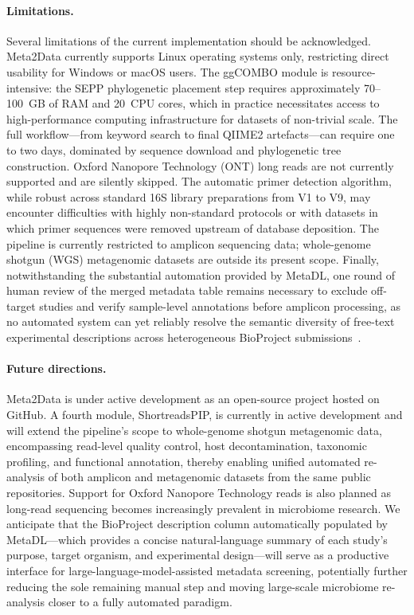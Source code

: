 \paragraph{Limitations.}
Several limitations of the current implementation should be acknowledged.
Meta2Data currently supports Linux operating systems only, restricting direct
usability for Windows or macOS users.
The ggCOMBO module is resource-intensive: the SEPP phylogenetic placement step
requires approximately 70--100~GB of RAM and 20~CPU cores, which in practice
necessitates access to high-performance computing infrastructure for datasets of
non-trivial scale.
The full workflow---from keyword search to final QIIME2 artefacts---can require
one to two days, dominated by sequence download and phylogenetic tree construction.
Oxford Nanopore Technology (ONT) long reads are not currently supported and are
silently skipped.
The automatic primer detection algorithm, while robust across standard 16S library
preparations from V1 to V9, may encounter difficulties with highly non-standard
protocols or with datasets in which primer sequences were removed upstream of
database deposition.
The pipeline is currently restricted to amplicon sequencing data; whole-genome
shotgun (WGS) metagenomic datasets are outside its present scope.
Finally, notwithstanding the substantial automation provided by MetaDL, one round of
human review of the merged metadata table remains necessary to exclude off-target
studies and verify sample-level annotations before amplicon processing, as no
automated system can yet reliably resolve the semantic diversity of free-text
experimental descriptions across heterogeneous BioProject submissions~\citep{bustos2026nonstandardized,kim2025fair}.

\paragraph{Future directions.}
Meta2Data is under active development as an open-source project hosted on GitHub.
A fourth module, ShortreadsPIP, is currently in active development and will extend
the pipeline's scope to whole-genome shotgun metagenomic data, encompassing
read-level quality control, host decontamination, taxonomic profiling, and
functional annotation, thereby enabling unified automated re-analysis of both
amplicon and metagenomic datasets from the same public repositories.
Support for Oxford Nanopore Technology reads is also planned as long-read
sequencing becomes increasingly prevalent in microbiome research.
We anticipate that the BioProject description column automatically populated by
MetaDL---which provides a concise natural-language summary of each study's
purpose, target organism, and experimental design---will serve as a productive
interface for large-language-model-assisted metadata screening, potentially
further reducing the sole remaining manual step and moving large-scale microbiome
re-analysis closer to a fully automated paradigm.
